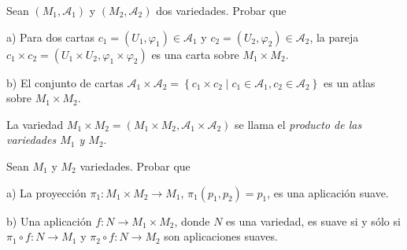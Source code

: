 \documentclass[12pt,answers]{exam}
\begin{document}
\begin{questions}
\question[1]
Sean $(M_1, \mathcal{A}_1)$ y  $(M_2, \mathcal{A}_2)$ dos variedades.
Probar que

a) Para dos cartas  $c_1 = (U_1, \varphi_1) \in \mathcal{A}_1$ y $c_2 = (U_2, \varphi_2) \in \mathcal{A}_2$, la pareja $c_1 \times c_2 = (U_1 \times U_2, \varphi_1 \times \varphi_2)$ es una carta sobre $M_1 \times M_2$.

b) El conjunto de cartas $\mathcal{A}_1 \times \mathcal{A}_2 = \left\{ c_1 \times c_2 \mid c_1 \in \mathcal{A}_1, c_2 \in \mathcal{A}_2 \right\}$ es un atlas sobre $M_1 \times M_2$. 

La variedad $M_1 \times M_2 = (M_1 \times M_2, \mathcal{A}_1 \times \mathcal{A}_2)$ se llama el \emph{producto de las variedades $M_1$ y $M_2$}.

\question[1]
Sean $M_1$ y $M_2$ variedades.
Probar que 

a) La proyección $\pi_1 : M_1 \times M_2 \to M_1$, $\pi_1(p_1, p_2) = p_1$, es una aplicación suave.

b) Una aplicación $f : N \to M_1 \times M_2$, donde $N$ es una variedad, es suave si y sólo si $\pi_1 \circ f : N \to M_1$ y $\pi_2 \circ f : N \to M_2$ son aplicaciones suaves.  


\end{questions}
\end{document}
